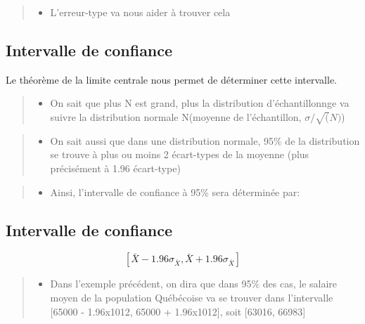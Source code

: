 \documentclass[
]{article}
\providecommand{\tightlist}{%
  \setlength{\itemsep}{0pt}\setlength{\parskip}{0pt}}
\begin{document}
\begin{quote}
\begin{itemize}
\tightlist
\item
  L'erreur-type va nous aider à trouver cela
\end{itemize}
\end{quote}

\hypertarget{intervalle-de-confiance-2}{%
\subsection{Intervalle de confiance}\label{intervalle-de-confiance-2}}

Le théorème de la limite centrale nous permet de déterminer cette
intervalle.

\begin{quote}
\begin{itemize}
\tightlist
\item
  On sait que plus N est grand, plus la distribution d'échantillonnge va
  suivre la distribution normale N(moyenne de l'échantillon,
  \(\sigma/\sqrt(N)\))
\end{itemize}
\end{quote}

\begin{quote}
\begin{itemize}
\tightlist
\item
  On sait aussi que dans une distribution normale, 95\% de la
  distribution se trouve à plus ou moins 2 écart-types de la moyenne
  (plus précisément à 1.96 écart-type)
\end{itemize}
\end{quote}

\begin{quote}
\begin{itemize}
\tightlist
\item
  Ainsi, l'intervalle de confiance à 95\% sera déterminée par:
\end{itemize}
\end{quote}

\hypertarget{intervalle-de-confiance-3}{%
\subsection{Intervalle de confiance}\label{intervalle-de-confiance-3}}

\[ [\bar{X} - 1.96\sigma_{\bar{X}} , \bar{X} + 1.96\sigma_{\bar{X}}]\]

\begin{quote}
\begin{itemize}
\tightlist
\item
  Dans l'exemple précédent, on dira que dans 95\% des cas, le salaire
  moyen de la population Québécoise va se trouver dans l'intervalle
  {[}65000 - 1.96x1012, 65000 + 1.96x1012{]}, soit {[}63016, 66983{]}
\end{itemize}
\end{quote}
\end{document}
